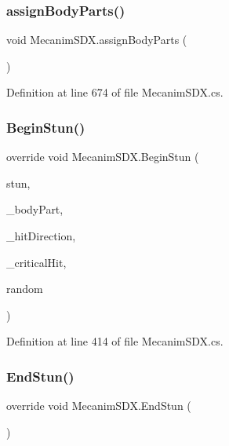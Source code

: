 \subsubsection{\texorpdfstring{assignBodyParts()}{assignBodyParts()}}
{\footnotesize\ttfamily void Mecanim\+S\+D\+X.\+assign\+Body\+Parts (\begin{DoxyParamCaption}{ }\end{DoxyParamCaption})\hspace{0.3cm}{\ttfamily [protected]}}



Definition at line 674 of file Mecanim\+S\+D\+X.\+cs.

\mbox{\label{class_mecanim_s_d_x_a4509ee3ec82243658c99206345c17901}} 
\subsubsection{\texorpdfstring{BeginStun()}{BeginStun()}}
{\footnotesize\ttfamily override void Mecanim\+S\+D\+X.\+Begin\+Stun (\begin{DoxyParamCaption}\item[{Enum\+Entity\+Stun\+Type}]{stun,  }\item[{Enum\+Body\+Part\+Hit}]{\+\_\+body\+Part,  }\item[{Utils.\+Enum\+Hit\+Direction}]{\+\_\+hit\+Direction,  }\item[{bool}]{\+\_\+critical\+Hit,  }\item[{float}]{random }\end{DoxyParamCaption})}



Definition at line 414 of file Mecanim\+S\+D\+X.\+cs.

\mbox{\label{class_mecanim_s_d_x_a11702afc757547f73ba1543e807a2957}} 
\subsubsection{\texorpdfstring{EndStun()}{EndStun()}}
{\footnotesize\ttfamily override void Mecanim\+S\+D\+X.\+End\+Stun (\begin{DoxyParamCaption}{ }\end{DoxyParamCaption})}



